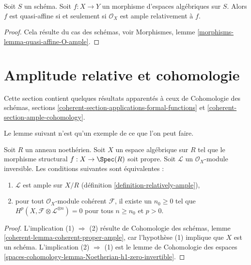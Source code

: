 \begin{lemma}
\label{lemma-quasi-affine-O-ample}
Soit $S$ un schéma. Soit $f : X \to Y$ un morphisme d'espaces algébriques
sur $S$. Alors $f$ est quasi-affine si et seulement si $\mathcal{O}_X$
est ample relativement à $f$.
\end{lemma}

\begin{proof}
Cela résulte du cas des schémas, voir
Morphismes, lemme \ref{morphisms-lemma-quasi-affine-O-ample}.
\end{proof}



\section{Amplitude relative et cohomologie}
\label{section-ample-and-proper}

\noindent
Cette section contient quelques résultats apparentés à ceux
de Cohomologie des schémas, sections
\ref{coherent-section-applications-formal-functions} et
\ref{coherent-section-ample-cohomology}.

\medskip\noindent
Le lemme suivant n'est qu'un exemple de ce que l'on peut faire.

\begin{lemma}
\label{lemma-vanshing-gives-ample}
Soit $R$ un anneau noethérien. Soit $X$ un espace algébrique sur $R$
tel que le morphisme structural $f : X \to \Spec(R)$ soit propre.
Soit $\mathcal{L}$ un $\mathcal{O}_X$-module inversible.
Les conditions suivantes sont équivalentes :
\begin{enumerate}
\item $\mathcal{L}$ est ample sur $X/R$
(définition \ref{definition-relatively-ample}),
\item pour tout $\mathcal{O}_X$-module cohérent $\mathcal{F}$,
il existe un $n_0 \geq 0$ tel que
$H^p(X, \mathcal{F} \otimes \mathcal{L}^{\otimes n}) = 0$
pour tous $n \geq n_0$ et $p > 0$.
\end{enumerate}
\end{lemma}

\begin{proof}
L'implication (1) $\Rightarrow$ (2) résulte de
Cohomologie des schémas, lemme \ref{coherent-lemma-coherent-proper-ample},
car l'hypothèse (1) implique que $X$ est un schéma.
L'implication (2) $\Rightarrow$ (1) est le
lemme de Cohomologie des espaces
\ref{spaces-cohomology-lemma-Noetherian-h1-zero-invertible}.
\end{proof}

